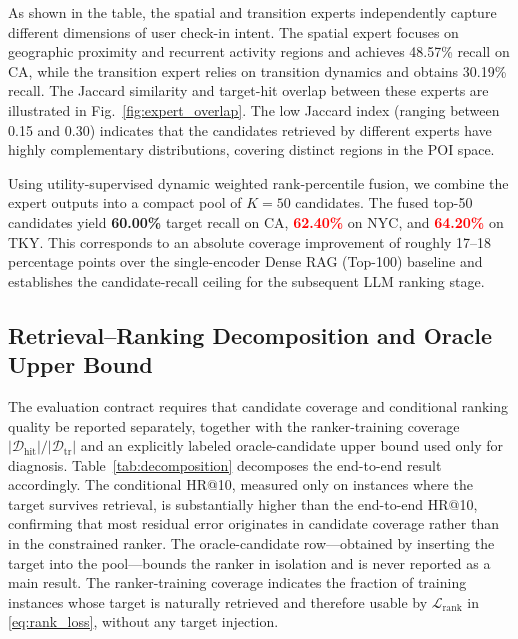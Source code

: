 \documentclass[journal]{IEEEtran}
\newcommand{\Train}{\mathcal{D}_{\mathrm{tr}}}
\newcommand{\HitTrain}{\mathcal{D}_{\mathrm{hit}}}
\newcommand{\mock}[1]{\textbf{\textcolor{red}{#1}}}
\begin{document}
As shown in the table, the spatial and transition experts independently capture different dimensions of user check-in intent. The spatial expert focuses on geographic proximity and recurrent activity regions and achieves 48.57\% recall on CA, while the transition expert relies on transition dynamics and obtains 30.19\% recall. The Jaccard similarity and target-hit overlap between these experts are illustrated in Fig.~\ref{fig:expert_overlap}. The low Jaccard index (ranging between 0.15 and 0.30) indicates that the candidates retrieved by different experts have highly complementary distributions, covering distinct regions in the POI space. 

Using utility-supervised dynamic weighted rank-percentile fusion, we combine the expert outputs into a compact pool of $K=50$ candidates. The fused top-50 candidates yield \textbf{60.00\%} target recall on CA, \mock{62.40\%} on NYC, and \mock{64.20\%} on TKY.
This corresponds to an absolute coverage improvement of roughly 17--18 percentage points over the single-encoder Dense RAG (Top-100) baseline and establishes the candidate-recall ceiling for the subsequent LLM ranking stage.

\subsection{Retrieval--Ranking Decomposition and Oracle Upper Bound}

The evaluation contract requires that candidate coverage and conditional ranking
quality be reported separately, together with the ranker-training coverage
$|\HitTrain|/|\Train|$ and an explicitly labeled oracle-candidate upper bound
used only for diagnosis. Table~\ref{tab:decomposition} decomposes the end-to-end
result accordingly. The conditional HR@10, measured only on instances where the
target survives retrieval, is substantially higher than the end-to-end HR@10,
confirming that most residual error originates in candidate coverage rather than
in the constrained ranker. The oracle-candidate row---obtained by inserting the
target into the pool---bounds the ranker in isolation and is never reported as a
main result. The ranker-training coverage indicates the fraction of training
instances whose target is naturally retrieved and therefore usable by
$\mathcal{L}_{\mathrm{rank}}$ in \eqref{eq:rank_loss}, without any target
injection.
\end{document}
